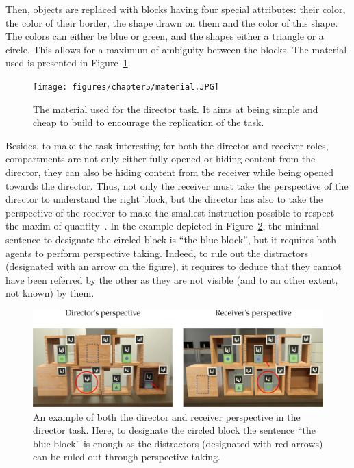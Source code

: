 \documentclass[a4paper,11pt,twoside]{StyleThese}
\begin{document}
Then, objects are replaced with blocks having four special attributes: their color, the color of their border, the shape drawn on them and the color of this shape. The colors can either be blue or green, and the shapes either a triangle or a circle. This allows for a maximum of ambiguity between the blocks. The material used is presented in Figure~\ref{fig:chap5material}.

\begin{figure}[hbtp]
\centering
\texttt{[image: figures/chapter5/material.JPG]}
\caption{The material used for the director task. It aims at being simple and cheap to build to encourage the replication of the task.}
\label{fig:chap5material}
\end{figure}

Besides, to make the task interesting for both the director and receiver roles, compartments are not only either fully opened or hiding content from the director, they can also be hiding content from the receiver while being opened towards the director. Thus, not only the receiver must take the perspective of the director to understand the right block, but the director has also to take the perspective of the receiver to make the smallest instruction possible to respect the maxim of quantity~\cite{grice1975logic}. In the example depicted in Figure~\ref{fig:chap5dtpersp}, the minimal sentence to designate the circled block is ``the blue block'', but it requires both agents to perform perspective taking. Indeed, to rule out the distractors (designated with an arrow on the figure), it requires to deduce that they cannot have been referred by the other as they are not visible (and to an other extent, not known) by them.

\begin{figure}[hbtp]
\centering
\includegraphics[width=\textwidth]{figures/chapter5/setup.png}
\caption{An example of both the director and receiver perspective in the director task. Here, to designate the circled block the sentence ``the blue block'' is enough as the distractors (designated with red arrows) can be ruled out through perspective taking.}
\label{fig:chap5dtpersp}
\end{figure}
\end{document}
